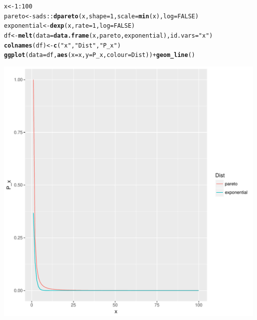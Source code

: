 \documentclass{article}\usepackage[]{graphicx}\usepackage[]{color}
\makeatletter
\def\maxwidth{ %
  \ifdim\Gin@nat@width>\linewidth
    \linewidth
  \else
    \Gin@nat@width
  \fi
}
\newcommand{\hlnum}[1]{\textcolor[rgb]{0.686,0.059,0.569}{#1}}%
\newcommand{\hlstr}[1]{\textcolor[rgb]{0.192,0.494,0.8}{#1}}%
\newcommand{\hlopt}[1]{\textcolor[rgb]{0,0,0}{#1}}%
\newcommand{\hlstd}[1]{\textcolor[rgb]{0.345,0.345,0.345}{#1}}%
\newcommand{\hlkwb}[1]{\textcolor[rgb]{0.69,0.353,0.396}{#1}}%
\newcommand{\hlkwc}[1]{\textcolor[rgb]{0.333,0.667,0.333}{#1}}%
\newcommand{\hlkwd}[1]{\textcolor[rgb]{0.737,0.353,0.396}{\textbf{#1}}}%
\newenvironment{kframe}{%
 \def\at@end@of@kframe{}%
 \ifinner\ifhmode%
  \def\at@end@of@kframe{\end{minipage}}%
  \begin{minipage}{\columnwidth}%
 \fi\fi%
 \def\FrameCommand##1{\hskip\@totalleftmargin \hskip-\fboxsep
 \colorbox{shadecolor}{##1}\hskip-\fboxsep
     \hskip-\linewidth \hskip-\@totalleftmargin \hskip\columnwidth}%
 \MakeFramed {\advance\hsize-\width
   \@totalleftmargin\z@ \linewidth\hsize
   \@setminipage}}%
 {\par\unskip\endMakeFramed%
 \at@end@of@kframe}
\newenvironment{knitrout}{}{} %
\makeatother
\begin{document}
\begin{knitrout}
\begin{kframe}
{\ttfamily\noindent\itshape\color{messagecolor}{\#\# Loading required package: reshape2}}\begin{alltt}
\hlstd{x} \hlkwb{<-} \hlnum{1}\hlopt{:}\hlnum{100}
\hlstd{pareto} \hlkwb{<-} \hlstd{sads}\hlopt{::}\hlkwd{dpareto}\hlstd{(x,} \hlkwc{shape}\hlstd{=}\hlnum{1}\hlstd{,} \hlkwc{scale} \hlstd{=} \hlkwd{min}\hlstd{(x),} \hlkwc{log} \hlstd{=} \hlnum{FALSE}\hlstd{)}
\hlstd{exponential} \hlkwb{<-} \hlkwd{dexp}\hlstd{(x,} \hlkwc{rate} \hlstd{=} \hlnum{1}\hlstd{,} \hlkwc{log} \hlstd{=} \hlnum{FALSE}\hlstd{)}
\hlstd{df} \hlkwb{<-} \hlkwd{melt}\hlstd{(}\hlkwc{data} \hlstd{=} \hlkwd{data.frame}\hlstd{(x,pareto,exponential),} \hlkwc{id.vars} \hlstd{=} \hlstr{"x"}\hlstd{)}
\hlkwd{colnames}\hlstd{(df)} \hlkwb{<-} \hlkwd{c}\hlstd{(}\hlstr{"x"}\hlstd{,}\hlstr{"Dist"}\hlstd{,}\hlstr{"P_x"}\hlstd{)}
\hlkwd{ggplot}\hlstd{(}\hlkwc{data} \hlstd{= df,} \hlkwd{aes}\hlstd{(}\hlkwc{x} \hlstd{= x,} \hlkwc{y} \hlstd{= P_x,} \hlkwc{colour} \hlstd{= Dist))} \hlopt{+} \hlkwd{geom_line}\hlstd{()}
\end{alltt}
\end{kframe}
\includegraphics[width=\maxwidth]{figure/unnamed-chunk-1-1} 

\end{knitrout}
\end{document}
